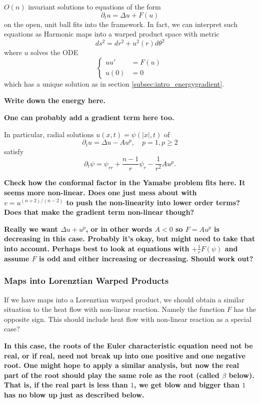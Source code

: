 \documentclass{amsart}
\begin{document}
\(O(n)\) invariant solutions to equations of the form
\[
\partial_t u = \Delta u + F(u)
\]
on the open, unit ball fits into the framework. In fact, we can interpret such equations as Harmonic maps into a warped product space with metric
\[
ds^2 = dr^2 + u^2(r) d\theta^2
\]
where \(u\) solves the ODE
\[
\begin{cases}
uu' &= F(u) \\
u(0) &= 0
\end{cases}
\]
which has a unique solution as in section \ref{subsec:intro_energygradient}.

\textbf{Write down the energy here.}

\textbf{One can probably add a gradient term here too.}

In particular, radial solutions \(u(x, t) = \psi(|x|, t)\) of
\[
\partial_t u = \Delta u - A u^p, \quad p = 1, p \geq 2
\]
satisfy
\[
\partial_t \psi = \psi_{rr} + \frac{n-1}{r} \psi_r - \frac{1}{r^2} A u^p.
\]

\textbf{Check how the conformal factor in the Yamabe problem fits here. It seems more non-linear. Does one just mess about with \(v = u^{(n+2)/(n-2)}\) to push the non-linearity into lower order terms? Does that make the gradient term non-linear though?}

\textbf{Really we want \(\Delta u + u^p\), or in other words \(A<0\) so \(F = A u^p\) is decreasing in this case. Probably it's okay, but might need to take that into account. Perhaps best to look at equations with \(+ \frac{1}{r} F(\psi)\) and assume \(F\) is odd and either increasing or decreasing. Should work out?}

\subsubsection*{Maps into Lorenztian Warped Products}

If we have maps into a Lorenztian warped product, we should obtain a similar situation to the heat flow with non-linear reaction. Namely the function \(F\) has the opposite sign. This should include heat flow with non-linear reaction as a special case?

\textbf{In this case, the roots of the Euler characteristic equation need not be real, or if real, need not break up into one positive and one negative root. One might hope to apply a similar analysis, but now the real part of the root should play the same role as the root (called \(\beta\) below). That is, if the real part is less than \(1\), we get blow and bigger than \(1\) has no blow up just as described below.}
\end{document}
